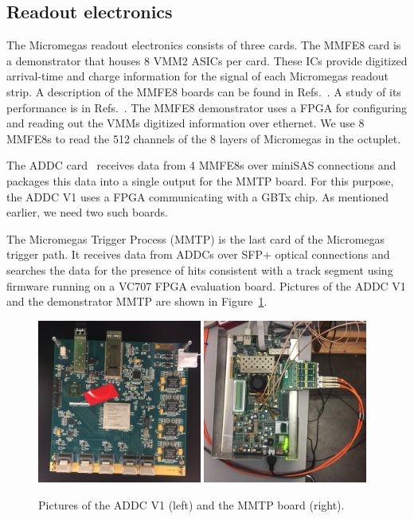 \subsection{Readout electronics}
\label{sec:exp-elx}
The Micromegas readout electronics consists of three cards. The MMFE8 card is a demonstrator that houses 8 VMM2 ASICs per card.
 These ICs provide digitized  arrival-time and charge information for the signal of each  Micromegas readout strip.  
 A description of the MMFE8 boards can be found in Refs.~\cite{noisy,mmfe8}. A study of its performance is in
 Refs.~\cite{noisy,noiseless}. The MMFE8 demonstrator uses a FPGA for configuring
 and reading out the VMMs digitized information  over ethernet.
 We use 8 MMFE8s to read the 512 channels of  the 8 layers of Micromegas in the octuplet.

 The ADDC card~\cite{nswtdr} receives data from 4 MMFE8s over miniSAS connections and packages this data
 into a single output for the MMTP board. For this purpose, the ADDC V1 uses a FPGA communicating with a GBTx chip.
 As mentioned earlier, we need two such boards.

The Micromegas Trigger Process (MMTP) is the last card of the Micromegas trigger path. It receives data from ADDCs over SFP+  optical connections and
 searches the data for the presence of hits consistent with a track segment using firmware running on a  VC707 FPGA evaluation board.
  Pictures of the ADDC V1 and the demonstrator MMTP are shown in Figure~\ref{fig:cards}.

\begin{figure}[!htpb]
  \begin{center}
    \includegraphics[width=0.48\textwidth]{figures/photos/IMG_0840.JPG}
    \includegraphics[width=0.48\textwidth]{figures/photos/IMG_0836.JPG}
  \end{center}
  \vspace{-10pt}
  \caption{Pictures of the ADDC V1  (left) and the MMTP board (right).}
  \label{fig:cards}
\end{figure}

